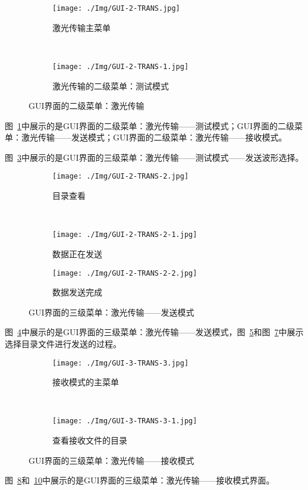\begin{figure}[!htbp]
	\centering
	\begin{subfigure}[c]{0.4\textwidth}
		\texttt{[image: ./Img/GUI-2-TRANS.jpg]}
		\caption{激光传输主菜单}
		\label{GUI-2-TRANS1.jpg}
	\end{subfigure}
~	
	\begin{subfigure}[c]{0.4\textwidth}
		\texttt{[image: ./Img/GUI-2-TRANS-1.jpg]}
		\caption{激光传输的二级菜单：测试模式}
		\label{GUI-2-TRANS-1.jpg}
	\end{subfigure}%
	\caption{GUI界面的二级菜单：激光传输}
\end{figure}

图~\ref{GUI-2-TRANS1.jpg}中展示的是GUI界面的二级菜单：激光传输——测试模式；GUI界面的二级菜单：激光传输——发送模式；GUI界面的二级菜单：激光传输——接收模式。


图~\ref{GUI-2-TRANS-1.jpg}中展示的是GUI界面的三级菜单：激光传输——测试模式——发送波形选择。



\begin{figure}[!htbp]
	\centering
	\begin{subfigure}[c]{0.4\textwidth}
	\texttt{[image: ./Img/GUI-2-TRANS-2.jpg]}
	\caption{目录查看}
	\label{GUI-2-TRANS-2.jpg}
	\end{subfigure}%
	~
	\begin{subfigure}[c]{0.4\textwidth}
		\texttt{[image: ./Img/GUI-2-TRANS-2-1.jpg]}
		\caption{数据正在发送}
		\label{GUI-2-TRANS-2-1.jpg}
	\end{subfigure}%
	
	\begin{subfigure}[c]{0.4\textwidth}
		\texttt{[image: ./Img/GUI-2-TRANS-2-2.jpg]}
		\caption{数据发送完成}
		\label{GUI-2-TRANS-2-2.jpg}
	\end{subfigure}
	\caption{GUI界面的三级菜单：激光传输——发送模式}
\end{figure}

图~\ref{GUI-2-TRANS-2.jpg}中展示的是GUI界面的三级菜单：激光传输——发送模式，图~\ref{GUI-2-TRANS-2-1.jpg}和图~\ref{GUI-2-TRANS-2-2.jpg}中展示选择目录文件进行发送的过程。


\begin{figure}[!htbp]
	\centering
	\begin{subfigure}[c]{0.4\textwidth}
		\texttt{[image: ./Img/GUI-3-TRANS-3.jpg]}
		\caption{接收模式的主菜单}
		\label{GUI-3-TRANS-3.jpg}
	\end{subfigure}
	~	
	\begin{subfigure}[c]{0.4\textwidth}
		\texttt{[image: ./Img/GUI-3-TRANS-3-1.jpg]}
		\caption{查看接收文件的目录}
		\label{GUI-3-TRANS-3-1.jpg}
	\end{subfigure}%
	\caption{GUI界面的三级菜单：激光传输——接收模式}
\end{figure}

图~\ref{GUI-3-TRANS-3.jpg}和~\ref{GUI-3-TRANS-3-1.jpg}中展示的是GUI界面的三级菜单：激光传输——接收模式界面。
